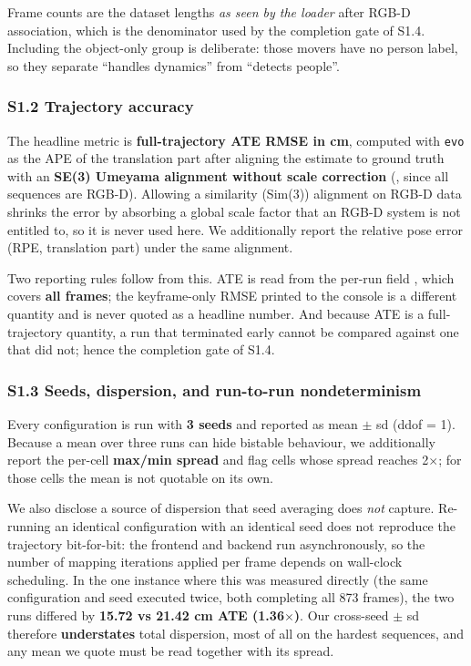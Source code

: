 Frame counts are the dataset lengths \emph{as seen by the loader} after RGB-D association, which is the denominator used by the completion gate of S1.4. Including the object-only group is deliberate: those movers have no person label, so they separate ``handles dynamics'' from ``detects people''.


\subsubsection{S1.2 Trajectory accuracy}


The headline metric is \textbf{full-trajectory ATE RMSE in cm}, computed with \texttt{evo} as the APE of the translation part after aligning the estimate to ground truth with an \textbf{SE(3) Umeyama alignment without scale correction} (, since all sequences are RGB-D). Allowing a similarity (Sim(3)) alignment on RGB-D data shrinks the error by absorbing a global scale factor that an RGB-D system is not entitled to, so it is never used here. We additionally report the relative pose error (RPE, translation part) under the same alignment.


Two reporting rules follow from this. ATE is read from the per-run  field , which covers \textbf{all frames}; the keyframe-only RMSE printed to the console is a different quantity and is never quoted as a headline number. And because ATE is a full-trajectory quantity, a run that terminated early cannot be compared against one that did not; hence the completion gate of S1.4.


\subsubsection{S1.3 Seeds, dispersion, and run-to-run nondeterminism}


Every configuration is run with \textbf{3 seeds} and reported as mean $\pm$ sd (ddof = 1). Because a mean over three runs can hide bistable behaviour, we additionally report the per-cell \textbf{max/min spread} and flag cells whose spread reaches 2$\times$; for those cells the mean is not quotable on its own.


We also disclose a source of dispersion that seed averaging does \emph{not} capture. Re-running an identical configuration with an identical seed does not reproduce the trajectory bit-for-bit: the frontend and backend run asynchronously, so the number of mapping iterations applied per frame depends on wall-clock scheduling. In the one instance where this was measured directly (the same configuration and seed executed twice, both completing all 873 frames), the two runs differed by \textbf{15.72 vs 21.42 cm ATE (1.36$\times$)}. Our cross-seed $\pm$ sd therefore \textbf{understates} total dispersion, most of all on the hardest sequences, and any mean we quote must be read together with its spread.


